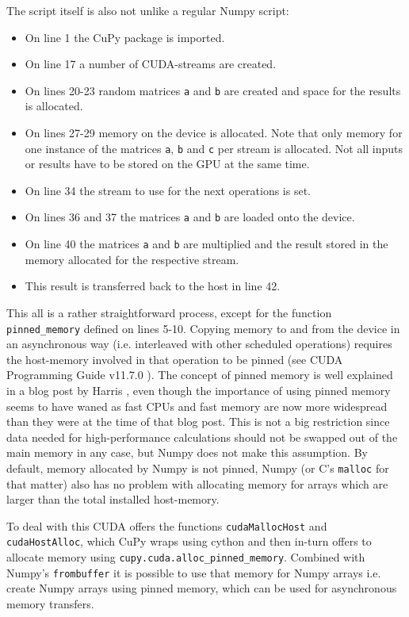 \documentclass[english,11pt,a4paper,table]{article} %
\begin{document}
The script itself is also not unlike a regular Numpy script:
\begin{itemize}
	\item On line 1 the CuPy package is imported.
	\item On line 17 a number of CUDA-streams are created.
	\item On lines 20-23 random matrices \texttt{a} and \texttt{b} are created and space for the results is allocated.
	\item On lines 27-29 memory on the device is allocated. Note that only memory for one instance of the matrices \texttt{a}, \texttt{b} and \texttt{c} per stream is allocated. Not all inputs or results have to be stored on the GPU at the same time.
	\item On line 34 the stream to use for the next operations is set.
	\item On lines 36 and 37 the matrices \texttt{a} and \texttt{b} are loaded onto the device.
	\item On line 40 the matrices \texttt{a} and \texttt{b} are multiplied and the result stored in the memory allocated for the respective stream.
	\item This result is transferred back to the host in line 42.
\end{itemize}

This all is a rather straightforward process, except for the function \texttt{pinned\_memory} defined on lines 5-10.
Copying memory to and from the device in an asynchronous way (i.e. interleaved with other scheduled operations) requires the host-memory involved in that operation to be pinned (see CUDA Programming Guide v11.7.0 \cite[section 3.2.6.3]{Programming_Guide:online}).
The concept of pinned memory is well explained in a blog post by Harris \cite{HowtoOpt83:online}, even though the importance of using pinned memory seems to have waned as fast CPUs and fast memory are now more widespread than they were at the time of that blog post.
This is not a big restriction since data needed for high-performance calculations should not be swapped out of the main memory in any case, but Numpy does not make this assumption.
By default, memory allocated by Numpy is not pinned, Numpy (or C's \texttt{malloc} for that matter) also has no problem with allocating memory for arrays which are larger than the total installed host-memory.

To deal with this CUDA offers the functions \texttt{cudaMallocHost} and \texttt{cudaHostAlloc}, which CuPy wraps using cython and then in-turn offers to allocate memory using \texttt{cupy.cuda.alloc\_pinned\_memory}.
Combined with Numpy's \texttt{frombuffer} it is possible to use that memory for Numpy arrays i.e. create Numpy arrays using pinned memory, which can be used for asynchronous memory transfers.
\end{document}

